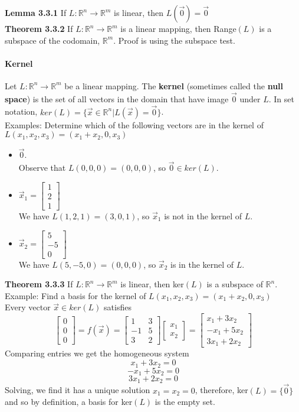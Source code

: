 \documentclass[10pt,letter]{article}
\begin{document}
\textbf{Lemma 3.3.1} If $L:\mathbb{R}^n\rightarrow\mathbb{R}^m$ is linear, then $L(\vec{0})=\vec{0}$ \\ 
\textbf{Theorem 3.3.2} If $L:\mathbb{R}^n\rightarrow\mathbb{R}^m$ is a linear mapping, then Range$(L)$ is a subspace of the codomain, $\mathbb{R}^m$. Proof is using the subspace test. 

\paragraph{Kernel} Let $L:\mathbb{R}^n\rightarrow\mathbb{R}^m$ be a linear mapping. The \textbf{kernel} (sometimes called the \textbf{null space}) is the set of all vectors in the domain that have image $\vec{0}$ under $L$. In set notation, $ker(L)=\{\vec{x}\in\mathbb{R}^n|L(\vec{x})=\vec{0}\}$. \\ 
Examples: Determine which of the following vectors are in the kernel of $L(x_1,x_2,x_3)=(x_1+x_2,0,x_3)$ \begin{itemize}
    \item $\vec{0}$. \\ Observe that $L(0,0,0) = (0,0,0)$, so $\vec{0}\in ker(L)$. 
    \item $\vec{x}_1=\begin{bmatrix}1\\2\\1\end{bmatrix}$ \\ We have $L(1,2,1)=(3,0,1)$, so $\vec{x}_1$ is not in the kernel of $L$. 
    \item $\vec{x}_2=\begin{bmatrix}5\\-5\\0\end{bmatrix}$ \\ We have $L(5,-5,0) = (0,0,0)$, so $\vec{x}_2$ is in the kernel of $L$.
\end{itemize}
\textbf{Theorem 3.3.3} If $L:\mathbb{R}^n\rightarrow\mathbb{R}^m$ is linear, then ker$(L)$ is a subspace of $\mathbb{R}^n$. \\ 
Example: Find a basis for the kernel of $L(x_1,x_2,x_3)=(x_1+x_2,0,x_3)$ \\ 
Every vector $\vec{x}\in ker(L)$ satisfies $$\begin{bmatrix}0\\0\\0\end{bmatrix}=f(\vec{x})=\begin{bmatrix}1&3\\-1&5\\3&2\end{bmatrix}\begin{bmatrix}x_1\\x_2\end{bmatrix}=\begin{bmatrix}x_1+3x_2\\-x_1+5x_2\\3x_1+2x_2\end{bmatrix}$$ Comparing entries we get the homogeneous system $$x_1+3x_2=0$$ $$-x_1+5x_2=0$$ $$3x_1+2x_2=0$$ Solving, we find it has a unique solution $x_1=x_2=0$, therefore, ker$(L)=\{\vec{0}\}$ and so by definition, a basis for ker$(L)$ is the empty set. 
\end{document}
